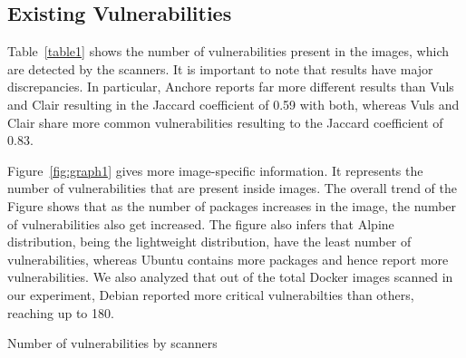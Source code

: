 \documentclass[a4paper,num-refs]{oup-contemporary}
\begin{document}
\subsection{Existing Vulnerabilities}

Table~\ref{table1} shows the number of vulnerabilities present in the images,
which are detected by the scanners.
It is important to note that results have major discrepancies. In particular,
Anchore reports far more different results than Vuls and Clair resulting in 
the Jaccard coefficient of 0.59 with both,
whereas Vuls and Clair share more common vulnerabilities resulting to the Jaccard coefficient of 0.83.

Figure~\ref{fig:graph1} gives more image-specific information.
It represents the number of vulnerabilities that are present inside images.
The overall trend of the Figure shows that as the number of packages increases in the image, the number of vulnerabilities
also get increased.
The figure also infers that Alpine distribution, being the
lightweight distribution, have the least number of vulnerabilities, whereas Ubuntu contains more packages and hence report more vulnerabilities.
We also analyzed that out of the total Docker images scanned in our experiment, Debian reported more critical vulnerabilties than others, reaching
up to 180.



\begin{table}[!ht]
%
       \centering
        \caption{\label{table1}Number of vulnerabilities by scanners}
\end{table}
\end{document}
